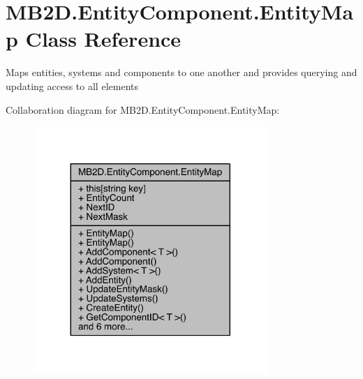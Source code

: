 \hypertarget{class_m_b2_d_1_1_entity_component_1_1_entity_map}{}\section{M\+B2\+D.\+Entity\+Component.\+Entity\+Map Class Reference}
\label{class_m_b2_d_1_1_entity_component_1_1_entity_map}


Maps entities, systems and components to one another and provides querying and updating access to all elements  




Collaboration diagram for M\+B2\+D.\+Entity\+Component.\+Entity\+Map\+:
\nopagebreak
\begin{figure}[H]
\begin{center}
\leavevmode
\includegraphics[width=251pt]{class_m_b2_d_1_1_entity_component_1_1_entity_map__coll__graph}
\end{center}
\end{figure}
